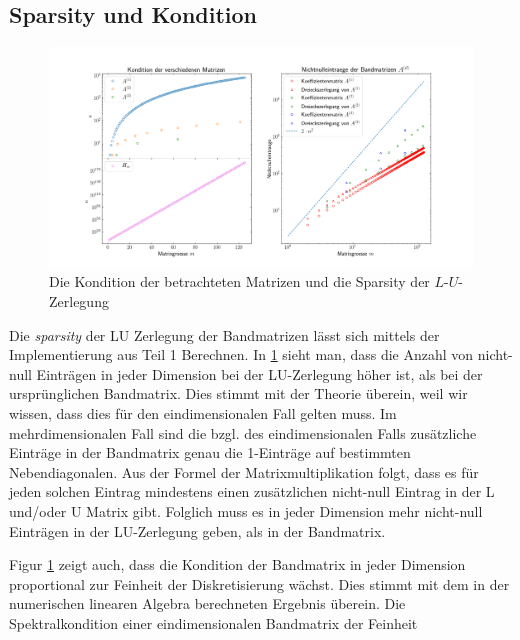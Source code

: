 \documentclass[smallheadings]{scrartcl}
\numberwithin{equation}{section}
\begin{document}
\subsection{Sparsity und Kondition}

\begin{figure}
	\centering
	\includegraphics[width=\linewidth]{Bericht/Bilder/sparsekon}
	\caption{Die Kondition der betrachteten Matrizen und die Sparsity der $L$-$U$-Zerlegung}
	\label{fig:sparsekon}
\end{figure}

Die \textit{sparsity} der LU Zerlegung der Bandmatrizen lässt sich mittels der Implementierung aus Teil 1 Berechnen. In \ref{fig:sparsekon} sieht man, dass die Anzahl von nicht-null Einträgen in jeder Dimension bei der LU-Zerlegung höher ist, als bei der ursprünglichen Bandmatrix. Dies stimmt mit der Theorie überein, weil wir wissen, dass dies für den eindimensionalen Fall gelten muss. Im mehrdimensionalen Fall sind die bzgl. des eindimensionalen Falls zusätzliche Einträge in der Bandmatrix genau die 1-Einträge auf bestimmten Nebendiagonalen. Aus der Formel der Matrixmultiplikation folgt, dass es für jeden solchen Eintrag mindestens einen zusätzlichen nicht-null Eintrag in der L und/oder U Matrix gibt. Folglich muss es in jeder Dimension mehr nicht-null Einträgen in der LU-Zerlegung geben, als in der Bandmatrix.

Figur \ref{fig:sparsekon} zeigt auch, dass die Kondition der Bandmatrix in jeder Dimension proportional zur Feinheit der Diskretisierung wächst. Dies stimmt mit dem in der numerischen linearen Algebra berechneten Ergebnis überein. Die Spektralkondition einer eindimensionalen Bandmatrix der Feinheit 


%
\end{document}
